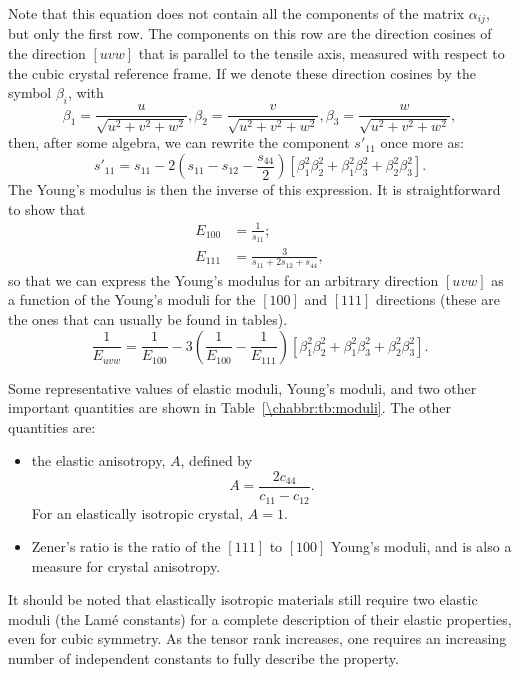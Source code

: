 Note that this equation does not contain all the components of the matrix $\alpha_{ij}$, but only the first row.  The components on this row are the direction cosines of the direction $[uvw]$ that is parallel to the tensile axis, measured with respect to the cubic crystal reference frame.  If we denote these direction cosines by the symbol $\beta_i$, with
\[
	\beta_1 = \frac{u}{\sqrt{u^2+v^2+w^2}}, \beta_2 = \frac{v}{\sqrt{u^2+v^2+w^2}}, 
	\beta_3 = \frac{w}{\sqrt{u^2+v^2+w^2}},
\]
then, after some algebra, we can rewrite the component $s'_{11}$ once more as:
\[
	s'_{11} = s_{11} - 2(s_{11}-s_{12}-\frac{s_{44}}{2})\left[\beta_1^2\beta_2^2+\beta_1^2\beta_3^2
	+\beta_2^2\beta_3^2\right].
\]
The Young's modulus is then the inverse of this expression.  It is straightforward to show that 
\begin{align*}
	E_{100} &= \frac{1}{s_{11}};\\
	E_{111} &= \frac{3}{s_{11}+2s_{12}+s_{44}},
\end{align*}
so that we can express the Young's modulus for an arbitrary direction $[uvw]$ as a function of the Young's moduli for the $[100]$ and $[111]$ directions (these are the ones that can usually be found in tables).
\begin{equation}
	\frac{1}{E_{uvw}} = \frac{1}{E_{100}} - 3\left(\frac{1}{E_{100}}-\frac{1}{E_{111}}\right)
	\left[\beta_1^2\beta_2^2+\beta_1^2\beta_3^2+\beta_2^2\beta_3^2\right].
\end{equation}

 Some representative values of elastic moduli, Young's moduli, and two other important quantities are shown in Table~\ref{\chabbr:tb:moduli}.  The other quantities are:
 \begin{itemize}
 	\item the elastic anisotropy, $A$, defined by 
	\[
		A = \frac{2c_{44}}{c_{11}-c_{12}}.
	\]
	For an elastically isotropic crystal, $A=1$.
	
	\item Zener's ratio is the ratio of the $[111]$ to $[100]$ Young's moduli, and is also a measure for crystal anisotropy.
\end{itemize}
It should be noted that elastically isotropic materials still require two elastic moduli (the Lam\'e constants) for a complete description of their elastic properties, even for cubic symmetry.  As the tensor rank increases, one requires an increasing number of independent constants to fully describe the property.



